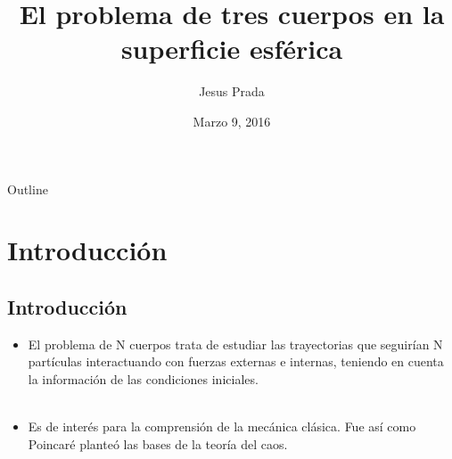 \documentclass[xcolor=dvipsnames]{beamer}
\title{\textbf{El problema de tres cuerpos en la superficie esférica}}
\author{Jesus Prada}
\institute[{\color{Black} Universidad de los Andes}] %
{
 \vspace{5mm} \normalsize Advisor: PhD Alonso Botero \\ \vspace{6mm} \small  Universidad de los Andes, Departamento de Física
}
\date{ \footnotesize Marzo 9, 2016}
\begin{document}
\begin{frame}
  \titlepage
\end{frame}
\begin{frame}{Outline}
 \tableofcontents
\end{frame}
\section{Introducción}
\subsection{Introducción}
\begin{frame}
\begin{itemize}
\item El problema de N cuerpos trata de estudiar las trayectorias que seguir\'ian N partículas interactuando con fuerzas externas e internas, teniendo en cuenta la informaci\'on de las condiciones iniciales.\\~\\ 
\item Es de inter\'es para la comprensi\'on de la mec\'anica cl\'asica. Fue as\'i como Poincar\'e plante\'o las bases de la teor\'ia del caos. \cite{poincare}
\end{itemize}
\end{frame}
\end{document}
